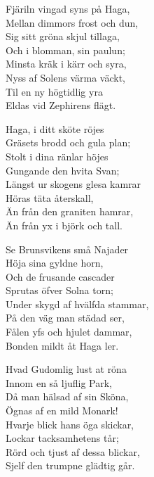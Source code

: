 \vspace{10pt}
Fjäriln vingad syns på Haga,\\
Mellan dimmors frost och dun,\\
Sig sitt gröna skjul tillaga,\\
Och i blomman, sin paulun;\\
Minsta kräk i kärr och syra,\\
Nyss af Solens värma väckt,\\
Til en ny högtidlig yra\\
Eldas vid Zephirens flägt.\par
\vspace{10pt}
Haga, i ditt sköte röjes\\
Gräsets brodd och gula plan;\\
Stolt i dina ränlar höjes\\
Gungande den hvita Svan;\\
Längst ur skogens glesa kamrar\\
Höras täta återskall,\\
Än från den graniten hamrar,\\
Än från yx i björk och tall.\par
\vspace{10pt}
Se Brunsvikens små Najader\\
Höja sina gyldne horn,\\
Och de frusande cascader\\
Sprutas öfver Solna torn;\\
Under skygd af hvälfda stammar,\\
På den väg man städad ser,\\
Fålen yfs och hjulet dammar,\\
Bonden mildt åt Haga ler.\par
\vspace{10pt}
Hvad Gudomlig lust at röna\\
Innom en så ljuflig Park,\\
Då man hälsad af sin Sköna,\\
Ögnas af en mild Monark!\\
Hvarje blick hans öga skickar,\\
Lockar tacksamhetens tår;\\
Rörd och tjust af dessa blickar,\\
Sjelf den trumpne glädtig går.

